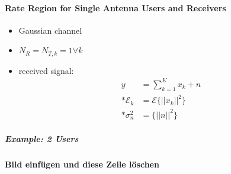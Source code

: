 \documentclass[a4paper, 10pt]{article}
\begin{document}
\paragraph{Rate Region for Single Antenna Users and Receivers}
\begin{itemize}
	\item Gaussian channel
	\item $N_R = N_{T,k} = 1 \forall	k $
	\item received signal: 
	\begin{align*}
		y &= \sum\limits_{k = 1}^{K}x_k + n\\ * \mathcal{E}_k &= \mathcal{E}\bigl\{||x_k||^2\bigr\} \\ *\sigma_n^2 &= \bigl\{||n||^2\bigr\}
	\end{align*}
\end{itemize}
\subparagraph*{Example: 2 Users}
\textbf{Bild einf\"ugen und diese Zeile l\"oschen}
\end{document}
